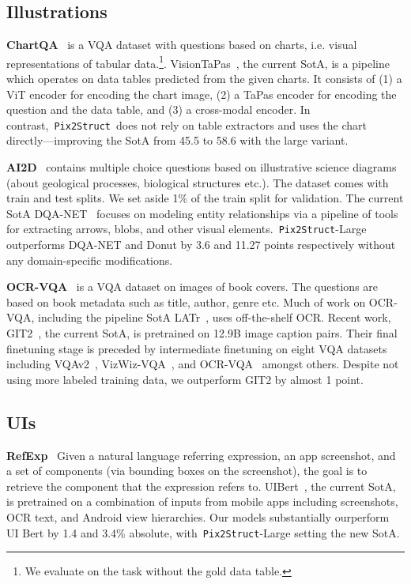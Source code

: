 \documentclass{article} \usepackage[accepted]{icml2023}
\newcommand\ourmodel{{\texttt{Pix2Struct}}}
\begin{document}
\subsection{Illustrations}

\textbf{ChartQA}~\citep{masry-etal-2022-chartqa} is a VQA dataset with questions based on charts, i.e. visual representations of tabular data.\footnote{We evaluate on the task without the gold data table.}. VisionTaPas~\citep{masry-etal-2022-chartqa}, the current SotA, is a pipeline which operates on data tables predicted from the given charts. It consists of (1) a ViT encoder for encoding the chart image, (2) a TaPas encoder for encoding the question and the data table, and (3) a cross-modal encoder. In contrast,~\ourmodel~does not rely on table extractors and uses the chart directly---improving the SotA from 45.5 to 58.6 with the large variant.


\textbf{AI2D}~\citep{kembhavi2016diagram} contains multiple choice questions based on illustrative science diagrams (about geological processes, biological structures etc.). The dataset comes with train and test splits. We set aside 1\% of the train split for validation. The current SotA DQA-NET~\citep{kembhavi2016diagram} focuses on modeling  entity relationships via a pipeline of tools for extracting arrows, blobs, and other visual elements.~\ourmodel-Large outperforms DQA-NET and Donut by 3.6 and 11.27 points respectively without any domain-specific modifications. 

\textbf{OCR-VQA}~\citep{mishra2019ocr} is a VQA dataset on images of book covers. The questions are based on book metadata such as title, author, genre etc. Much of work on OCR-VQA, including the pipeline SotA LATr~\citep{biten2022latr}, uses off-the-shelf OCR. Recent work, GIT2~\citep{wang2022git}, the current SotA, is pretrained on 12.9B image caption pairs.  Their final finetuning stage is preceded by intermediate finetuning on eight VQA datasets including VQAv2~\citep{goyal2017making}, VizWiz-VQA~\citep{chen2022grounding}, and OCR-VQA~\citep{mishra2019ocr} amongst others. Despite not using more labeled training data, we outperform GIT2 by almost 1 point. 

\subsection{UIs}
\textbf{RefExp}~\citep{uibert} Given a natural language referring expression, an app screenshot, and a set of components (via bounding boxes on the screenshot), the goal is to retrieve the component that the expression refers
to. UIBert~\citep{uibert}, the current SotA, is pretrained on a combination of inputs from mobile apps including  screenshots, OCR text, and Android view hierarchies. Our models substantially ourperform UI Bert by 1.4 and 3.4\% absolute, with~\ourmodel-Large setting the new SotA.
\end{document}
